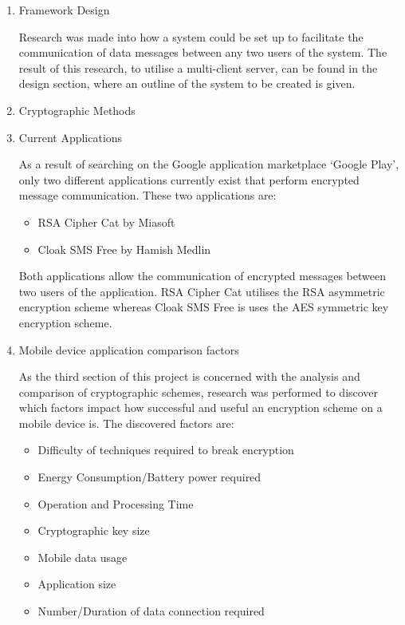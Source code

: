\documentclass[a4paper,11pt]{article}
\begin{document}
\begin{enumerate}
  \item
  \begin{description}
    \item[Framework Design] 
  \end{description}
  Research was made into how a system could be set up to facilitate the communication of data messages between any two users of the system. The result of this research, to utilise a multi-client server, can be found in the design section, where an outline of the system to be created is given.
  \item
  \begin{description}
    \item[Cryptographic Methods] 
  \end{description}
  \item
  \begin{description}
    \item[Current Applications] 
  \end{description}
  As a result of searching on the Google application marketplace ‘Google Play’, only two different applications currently exist that perform encrypted message communication. These two applications are:
  \begin{itemize}
    \item RSA Cipher Cat by Miasoft
    \item Cloak SMS Free by Hamish Medlin
  \end{itemize}
  Both applications allow the communication of encrypted messages between two users of the application. RSA Cipher Cat utilises the RSA asymmetric encryption scheme whereas Cloak SMS Free is uses the AES symmetric key encryption scheme.
  \item
  \begin{description}
    \item[Mobile device application comparison factors] 
  \end{description}
  As the third section of this project is concerned with the analysis and comparison of cryptographic schemes, research was performed to discover which factors impact how successful and useful an encryption scheme on a mobile device is. The discovered factors are:
  \begin{itemize}
    \item Difficulty of techniques required to break encryption
    \item Energy Consumption/Battery power required
    \item Operation and Processing Time
    \item Cryptographic key size
    \item Mobile data usage
    \item Application size
    \item Number/Duration of data connection required
  \end{itemize}
\end{enumerate}
\end{document}
